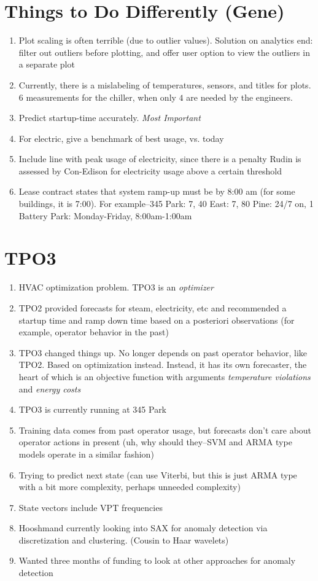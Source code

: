 \documentclass[12pt,a4paper]{article}
\begin{document}
\section{Things to Do Differently (Gene)}
\begin{enumerate}
	\item Plot scaling is often terrible (due to outlier values). Solution on
		analytics end: filter out outliers before plotting, and offer user option
		to view the outliers in a separate plot
	\item Currently, there is a mislabeling of temperatures, sensors, and
		titles for plots. $6$ measurements for the chiller, when only $4$ are
		needed by the engineers.
	\item Predict startup-time accurately. \emph{Most Important}
	\item For electric, give a benchmark of best usage, vs. today
	\item Include line with peak usage of electricity, since there is a penalty
		Rudin is assessed by Con-Edison for electricity usage above a certain
		threshold
	\item Lease contract states that system ramp-up must be by 8:00 am (for
		some buildings, it is 7:00). For example--345 Park: 7, 40 East: 7, 80 Pine:
		24/7 on, 1 Battery Park: Monday-Friday, 8:00am-1:00am
\end{enumerate}
\section{TPO3}
\begin{enumerate}
	\item HVAC optimization problem. TPO3 is an \emph{optimizer}
	\item TPO2 provided forecasts for steam, electricity, etc and recommended
		a startup time and ramp down time based on a posteriori observations (for
		example, operator behavior in the past)
	\item TPO3 changed things up. No longer depends on past operator behavior,
		like TPO2. Based on optimization instead. Instead, it has its own
		forecaster, the heart of which is an objective function with arguments
		\emph{temperature violations} and \emph{energy costs}
	\item TPO3 is currently running at 345 Park
	\item Training data comes from past operator usage, but forecasts don't
		care about operator actions in present (uh, why should they--SVM and ARMA
		type models operate in a similar fashion)
	\item Trying to predict next state (can use Viterbi, but this is just ARMA
		type with a bit more complexity, perhaps unneeded complexity)
	\item State vectors include VPT frequencies
	\item Hooshmand currently looking into SAX for anomaly detection via
		discretization and clustering. (Cousin to Haar wavelets)
	\item Wanted three months of funding to look at other approaches for
		anomaly detection
\end{enumerate}
\end{document}
